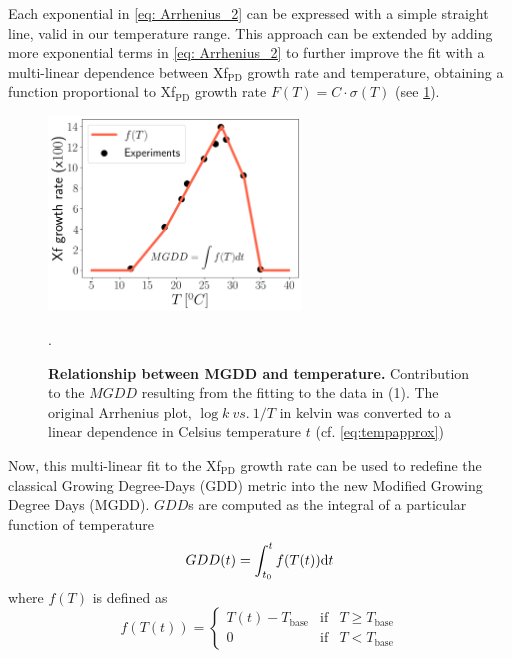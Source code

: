 Each exponential in \cref{eq: Arrhenius_2} can be expressed with a simple
straight line, valid in our temperature range. This approach can be extended by
adding more exponential terms in \cref{eq: Arrhenius_2} to further improve the
fit with a multi-linear dependence between Xf$_{\textrm{PD}}$ growth rate and
temperature, obtaining a function proportional to Xf$_{\textrm{PD}}$ growth
rate $F(T)=C\cdot\sigma(T)$ (see \cref{figS2}).

\begin{figure}[H]
    \centering
    \includegraphics[width=0.6\textwidth]{Figures/Climatic_layer_1.png}
    \caption{\textbf{Relationship between MGDD and temperature.}
        Contribution to the $MGDD$ resulting from the fitting to the data in
        (1). The
        original Arrhenius plot, $\log{k} \ vs. \ 1/T$ in kelvin was converted
        to
        a linear dependence in Celsius temperature $t$ (cf.
        \cref{eq:tempapprox})}.
    \label{figS2} %
\end{figure}

Now, this multi-linear fit to the Xf$_{\textrm{PD}}$ growth rate can be
used to redefine the classical Growing Degree-Days (GDD) metric into the new
Modified Growing Degree Days (MGDD). $GDD$s are computed as the integral of a
particular function of temperature
\begin{equation}
    GDD(t)=\int_{t_0}^tf(T(t))\mathrm{d} t
\end{equation}
where $f(T)$ is defined as
\begin{equation}
    f(T(t))=\left\{\begin{array}{ccc}
        T(t) - T_{\textrm{base}} & \textrm{if} & T\geq T_{\textrm{base}} \\
        0                        & \textrm{if} & T < T_{\textrm{base}}
    \end{array} \right.
\end{equation}

